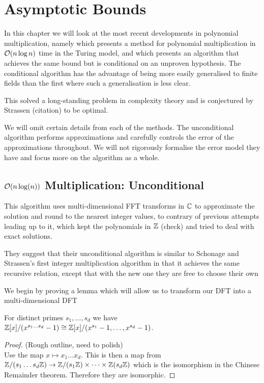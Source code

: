 \chapter{Asymptotic Bounds}\label{ch:asymptotic-bounds}

In this chapter we will look at the most recent developments in polynomial multiplication, namely \cite{nlogn} which presents a method for polynomial multiplication in $\mathcal O(n \log n)$ time in the Turing model, and \cite{ffnlogn} which presents an algorithm that achieves the same bound but is conditional on an unproven hypothesis. The conditional algorithm has the advantage of being more easily generalised to finite fields than the first where such a generalisation is less clear.

This solved a long-standing problem in complexity theory and is conjectured by Strassen (citation) to be optimal.

We will omit certain details from each of the methods. The unconditional algorithm performs approximations and carefully controls the error of the approximations throughout. We will not rigorously formalise the error model they have and focus more on the algorithm as a whole.

\section{$\mathcal O(n\log(n))$ Multiplication: Unconditional}
\label{subsec:nlogn}

This algorithm uses multi-dimensional FFT transforms in ${\mathbb C}$ to approximate the solution and round to the nearest integer values, to contrary of previous attempts leading up to it, which kept the polynomials in ${\mathbb Z}$ (check) and tried to deal with exact solutions.

They suggest that their unconditional algorithm is similar to Schonage and Strassen's first integer multiplication algorithm in that it achieves the same recursive relation, except that with the new one they are free to choose their own

We begin by proving a lemma which will allow us to transform our DFT into a multi-dimensional DFT

\begin{lemma}
    For distinct primes $s_1, \ldots, s_d$ we have ${\mathbb Z}[x]/(x^{s_1\ldots s_d} - 1) \cong {\mathbb Z}[x]/(x^{s_1} - 1, \ldots, x^{s_d} - 1)$.
\end{lemma}

\begin{proof}
    (Rough outline, need to polish)\\
    Use the map $x \mapsto x_1\ldots x_d$. This is then a map from ${\mathbb Z}/(s_1\ldots s_d {\mathbb Z}) \to {\mathbb Z}/(s_1 {\mathbb Z}) \times \cdots \times {\mathbb Z}(s_d {\mathbb Z})$ which is the isomorphism in the Chinese Remainder theorem. Therefore they are isomorphic.
\end{proof}

